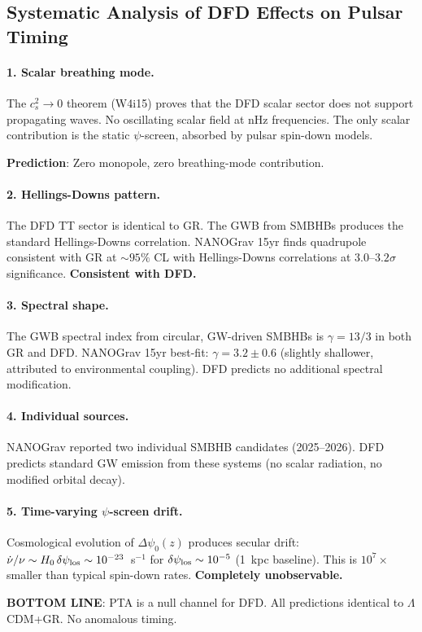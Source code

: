 \documentclass[11pt,a4paper]{article}
\newcounter{findingctr}
\newenvironment{finding}[1][]{%
  \refstepcounter{findingctr}%
  \begin{tcolorbox}[colback=blue!3!white, colframe=blue!50!black,
    title=\textbf{Finding \thefindingctr: #1}]
}{%
  \end{tcolorbox}%
}
\newcommand{\Dpsi}{\Delta\psi}
\begin{document}
\begin{finding}[\textbf{DFD Predicts Zero Anomalous PTA Timing}]
\label{find:pta}

\subsection*{Systematic Analysis of DFD Effects on Pulsar Timing}

\paragraph{1. Scalar breathing mode.}
The $c_s^2 \to 0$ theorem (W4i15) proves that the DFD scalar sector
does not support propagating waves.  No oscillating scalar field at
nHz frequencies.  The only scalar contribution is the static
$\psi$-screen, absorbed by pulsar spin-down models.

\textbf{Prediction}: Zero monopole, zero breathing-mode contribution.

\paragraph{2. Hellings-Downs pattern.}
The DFD TT sector is identical to GR.  The GWB from SMBHBs produces
the standard Hellings-Downs correlation.  NANOGrav 15yr finds
quadrupole consistent with GR at $\sim 95\%$ CL with Hellings-Downs
correlations at $3.0$--$3.2\sigma$ significance.
\textbf{Consistent with DFD.}

\paragraph{3. Spectral shape.}
The GWB spectral index from circular, GW-driven SMBHBs is
$\gamma = 13/3$ in both GR and DFD.  NANOGrav 15yr best-fit:
$\gamma = 3.2 \pm 0.6$ (slightly shallower, attributed to
environmental coupling).  DFD predicts no additional spectral
modification.

\paragraph{4. Individual sources.}
NANOGrav reported two individual SMBHB candidates (2025--2026).
DFD predicts standard GW emission from these systems (no scalar
radiation, no modified orbital decay).

\paragraph{5. Time-varying $\psi$-screen drift.}
Cosmological evolution of $\Dpsi_0(z)$ produces secular drift:
$\dot{\nu}/\nu \sim H_0\,\delta\psi_{\rm los} \sim 10^{-23}$~s$^{-1}$
for $\delta\psi_{\rm los} \sim 10^{-5}$ (1~kpc baseline).
This is $10^7\times$ smaller than typical spin-down rates.
\textbf{Completely unobservable.}

\textbf{BOTTOM LINE}: PTA is a null channel for DFD.  All predictions
identical to $\Lambda$CDM+GR.  No anomalous timing.

\end{finding}
\end{document}
